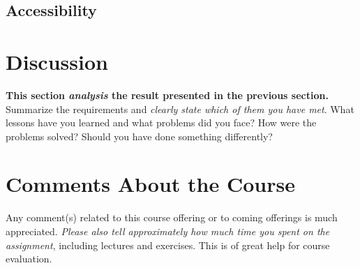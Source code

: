 \documentclass[a4paper]{scrartcl}
\begin{document}
\subsection{Accessibility}


\section{Discussion}

\textbf{This section \textit{analysis} the result presented in the previous section.} \\

\noindent Summarize the requirements and \textit{clearly state which of them you have met}. What lessons have you learned and what problems did you face? How were the problems solved? Should you have done something differently?

\section{Comments About the Course}

Any comment(s) related to this course offering or to coming offerings is much appreciated. \textit{Please also tell approximately how much time you spent on the assignment}, including lectures and exercises. This is of great help for course evaluation.

\printbibliography[heading=bibintoc]
\end{document}
